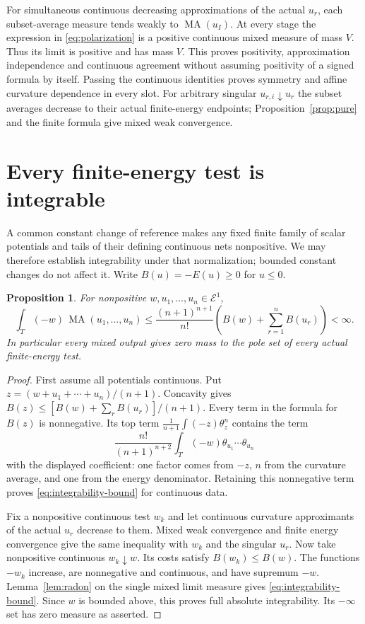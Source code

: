 \documentclass[11pt]{article}
\newtheorem{proposition}[theorem]{Proposition}
\newcommand{\MA}{\operatorname{MA}}
\newcommand{\E}{\mathcal E}
\begin{document}
For simultaneous continuous decreasing approximations of the actual
$u_r$, each subset-average measure tends weakly to $\MA(u_I)$.
At every stage the expression in \eqref{eq:polarization} is a positive
continuous mixed measure of mass $V$. Thus its limit is positive and
has mass $V$. This proves positivity, approximation independence
and continuous agreement without assuming positivity of a signed
formula by itself. Passing the continuous identities proves symmetry
and affine curvature dependence in every slot. For arbitrary singular
$u_{r,i}\downarrow u_r$ the subset averages decrease to their actual
finite-energy endpoints; Proposition~\ref{prop:pure} and the finite
formula give mixed weak convergence.

\section{Every finite-energy test is integrable}

A common constant change of reference makes any fixed finite family
of scalar potentials and tails of their defining continuous nets
nonpositive. We may therefore establish integrability under that
normalization; bounded constant changes do not affect it. Write
$B(u)=-E(u)\geq0$ for $u\leq0$.

\begin{proposition}\label{prop:integrability}
For nonpositive $w,u_1,\ldots,u_n\in\E^1$,
\begin{equation}\label{eq:integrability-bound}
 \int_T(-w)\,\MA(u_1,\ldots,u_n)
   \leq \frac{(n+1)^{n+1}}{n!}
                      \left(B(w)+\sum_{r=1}^nB(u_r)\right)<\infty.
\end{equation}
In particular every mixed output gives zero mass to the pole set
of every actual finite-energy test.
\end{proposition}
\begin{proof}
First assume all potentials continuous. Put
$z=(w+u_1+\cdots+u_n)/(n+1)$. Concavity gives
$B(z)\leq[B(w)+\sum_rB(u_r)]/(n+1)$.
Every term in the formula for $B(z)$ is nonnegative. Its top term
$\frac1{n+1}\int(-z)\theta_z^n$ contains the term
\[
 \frac{n!}{(n+1)^{n+2}}
        \int_T(-w)\theta_{u_1}\cdots\theta_{u_n}
\]
with the displayed coefficient: one factor comes from $-z$, $n$
from the curvature average, and one from the energy denominator.
Retaining this nonnegative term proves
\eqref{eq:integrability-bound} for continuous data.

Fix a nonpositive continuous test $w_k$ and let continuous curvature
approximants of the actual $u_r$ decrease to them. Mixed weak
convergence and finite energy convergence give the same inequality
with $w_k$ and the singular $u_r$. Now take nonpositive continuous
$w_k\downarrow w$. Its costs satisfy $B(w_k)\leq B(w)$.
The functions $-w_k$ increase, are nonnegative and continuous,
and have supremum $-w$. Lemma~\ref{lem:radon} on the single mixed
limit measure gives \eqref{eq:integrability-bound}. Since $w$
is bounded above, this proves full absolute integrability. Its
$-\infty$ set has zero measure as asserted.
\end{proof}
\end{document}
